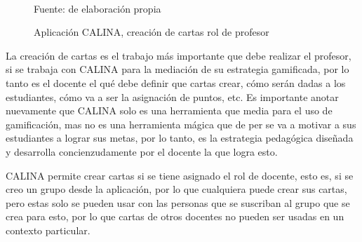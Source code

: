 \begin{figure}[H]
\caption[]{Aplicación CALINA, creación de cartas rol de profesor}
\centering
{}
\hspace{1cm}
\hspace{1cm}
\\
{\footnotesize Fuente: de elaboración propia}
\end{figure}

La creación de cartas es el trabajo más importante que debe realizar el profesor, si se trabaja con CALINA 
para la mediación de su estrategia gamificada, por lo tanto es el docente el qué debe definir que cartas 
crear, cómo serán dadas a los estudiantes, cómo va a ser la asignación de puntos, etc. Es importante anotar 
nuevamente que CALINA solo es una herramienta que media para el uso de gamificación, mas no es una herramienta 
mágica que de per se va a motivar a sus estudiantes a lograr sus metas, por lo tanto, es la estrategia 
pedagógica diseñada y desarrolla concienzudamente por el docente la que logra esto.

CALINA permite crear cartas si se tiene asignado el rol de docente, esto es, si se creo un grupo desde la 
aplicación, por lo que cualquiera puede crear sus cartas, pero estas solo se pueden usar con las personas que 
se suscriban al grupo que se crea para esto, por lo que cartas de otros docentes no pueden ser usadas en un 
contexto particular.

